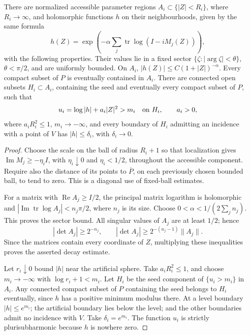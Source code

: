 \begin{lemma}\label{quo:guard}
There are normalized accessible parameter regions \(A_i\subset\{|Z|<R_i\}\),
where \(R_i\to\infty\), and holomorphic functions \(h\) on their
neighbourhoods, given by the same formula
\begin{equation}\label{quo:guard-formula}
 h(Z)=\exp\left(-\alpha\sum_j\operatorname{tr}
                      \log(I-iM_j(Z))\right),
\end{equation}
with the following properties. Their values lie in a fixed sector
\(\{\zeta:|\arg\zeta|<\theta\}\), \(\theta<\pi/2\), and are
uniformly bounded. On \(A_i\), \(|h(Z)|\leq C(1+|Z|)^{-\alpha}\).
Every compact subset of \(P\) is eventually contained in \(A_i\).
There are connected open subsets \(H_i\subset A_i\), containing
the seed and eventually every compact subset of \(P\), such that
\[
 u_i=\log|h|+a_i|Z|^2>m_i\quad\hbox{on }H_i,
 \qquad a_i>0,
\]
where \(a_iR_i^2\leq1\), \(m_i\to-\infty\), and every boundary
of \(H_i\) admitting an incidence with a point of \(V\) has
\(|h|\leq\delta_i\), with \(\delta_i\to0\).
\end{lemma}
\begin{proof}
Choose the scale on the ball of radius \(R_i+1\) so that localization
gives \(\operatorname{Im}M_j\geq-\eta_i I\), with
\(\eta_i\downarrow0\) and \(\eta_i<1/2\), throughout the accessible
component. Require also the distance of its points to
\(\overline P\), on each previously chosen bounded ball, to tend
to zero. This is a diagonal use of fixed-ball estimates.

For a matrix with \(\operatorname{Re}A_j\geq I/2\), the principal
matrix logarithm is holomorphic and
\(|\operatorname{Im}\operatorname{tr}\log A_j|<n_j\pi/2\),
where \(n_j\) is its size. Choose
\(0<\alpha<1/(2\sum_jn_j)\). This proves the sector bound.
All singular values of \(A_j\) are at least \(1/2\); hence
\[
 |\det A_j|\geq2^{-n_j},\qquad
 |\det A_j|\geq2^{-(n_j-1)}\|A_j\|.
\]
Since the matrices contain every coordinate of \(Z\), multiplying
these inequalities proves the asserted decay estimate.

Let \(r_i\downarrow0\) bound \(|h|\) near the artificial sphere.
Take \(a_iR_i^2\leq1\), and choose \(m_i\to-\infty\) with
\(\log r_i+1<m_i\). Let \(H_i\) be the seed component of
\(\{u_i>m_i\}\) in \(A_i\). Any connected compact subset of
\(P\) containing the seed belongs to \(H_i\) eventually, since
\(h\) has a positive minimum modulus there. At a level boundary
\(|h|\leq e^{m_i}\); the artificial boundary lies below the level;
and the other boundaries admit no incidence with \(V\). Take
\(\delta_i=e^{m_i}\). The function \(u_i\) is strictly
plurisubharmonic because \(h\) is nowhere zero.
\end{proof}

